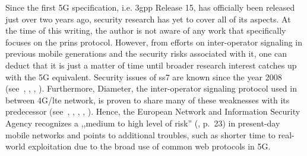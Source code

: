 Since the first 5G specification, i.e. \gls{3gpp} Release 15, has officially been released just over two years ago, security research has yet to cover all of its aspects.
At the time of this writing, the author is not aware of any work that specifically focuses on the \gls{prins} protocol.
However, from efforts on inter-operator signaling in previous mobile generations and the security risks associated with it, one can deduct that it is just a matter of time until broader research interest catches up with the 5G equivalent.
Security issues of \gls{ss7} are known since the year 2008 (see~\cite{engel2008locating}, \cite{engel2014locate}, \cite{oliveira2014world}, \cite{puzankov2014how}).
Furthermore, Diameter, the inter-operator signaling protocol used in between 4G/\gls{lte} network, is proven to share many of these weaknesses with its predecessor (see~\cite{rao2015unblock}, \cite{rao2016privacy}, \cite{rao2016where}, \cite{holtmanns2016user}, \cite{holtmanns2017sms}).
Hence, the European Network and Information Security Agency recognizes a ,,medium to high level of risk'' (\cite{enisa2018signal}, p.~23) in present-day mobile networks and points to additional troubles, such as shorter time to real-world exploitation due to the broad use of common web protocols in 5G.
